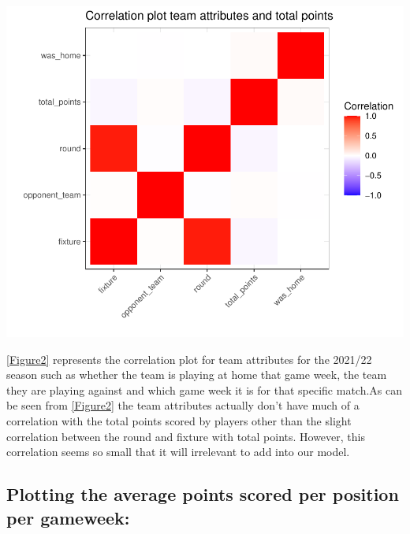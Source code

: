 \documentclass[11pt,preprint, authoryear]{elsarticle}
\let\origfigure\figure
\let\endorigfigure\endfigure
\renewenvironment{figure}[1][2] {
    \expandafter\origfigure\expandafter[H]
} {
    \endorigfigure
}
\numberwithin{equation}{section}
\numberwithin{figure}{section}
\numberwithin{table}{section}
\begin{document}
\begin{figure}[H]

{\centering \includegraphics{Fantasy_premier_league_team_prediction_files/figure-latex/unnamed-chunk-3-1} 

}

\caption{Team attributes correlation plot\label{Figure2}}\label{fig:unnamed-chunk-3}
\end{figure}

\ref{Figure2} represents the correlation plot for team attributes for
the 2021/22 season such as whether the team is playing at home that game
week, the team they are playing against and which game week it is for
that specific match.As can be seen from \ref{Figure2} the team
attributes actually don't have much of a correlation with the total
points scored by players other than the slight correlation between the
round and fixture with total points. However, this correlation seems so
small that it will irrelevant to add into our model.

\hypertarget{plotting-the-average-points-scored-per-position-per-gameweek}{%
\subsection{Plotting the average points scored per position per
gameweek:}\label{plotting-the-average-points-scored-per-position-per-gameweek}}
\end{document}

